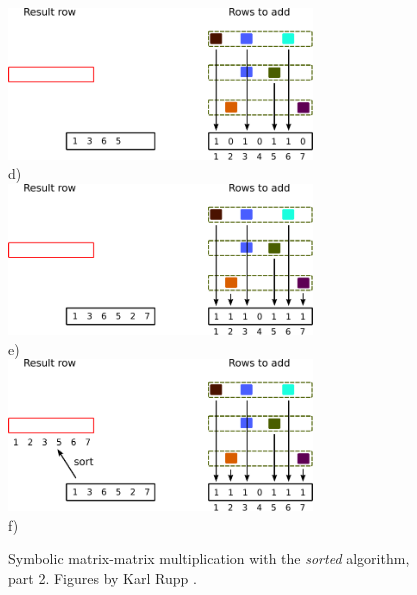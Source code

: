 \begin{figure}[H]
\centering
\includegraphics[width=0.72\textwidth]{sorted/spgemm-sorted-7}\\
d)\\
\vspace*{5mm}
\includegraphics[width=0.72\textwidth]{sorted/spgemm-sorted-9}\\
e)\\
\vspace*{5mm}
\includegraphics[width=0.72\textwidth]{sorted/spgemm-sorted-10}\\
f)\\
\vspace*{5mm}
\caption{Symbolic matrix-matrix multiplication with the \textit{sorted} algorithm, part 2. Figures by Karl Rupp \cite{karli_LANS_image}.}
\label{fig:spgemm-sorted_2}
\end{figure}



